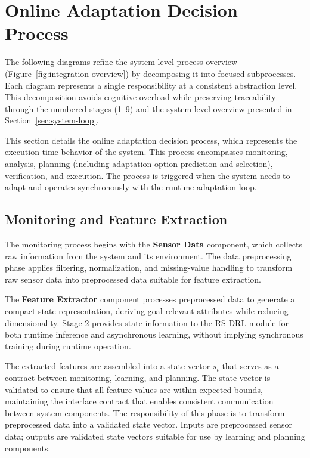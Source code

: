 \documentclass[11pt,a4paper]{article}
\begin{document}

\section{Online Adaptation Decision Process}
\label{sec:online-decision}

The following diagrams refine the system-level process overview (Figure~\ref{fig:integration-overview}) by decomposing it into focused subprocesses. Each diagram represents a single responsibility at a consistent abstraction level. This decomposition avoids cognitive overload while preserving traceability through the numbered stages (1--9) and the system-level overview presented in Section~\ref{sec:system-loop}.

This section details the online adaptation decision process, which represents the execution-time behavior of the system. This process encompasses monitoring, analysis, planning (including adaptation option prediction and selection), verification, and execution. The process is triggered when the system needs to adapt and operates synchronously with the runtime adaptation loop.

\subsection{Monitoring and Feature Extraction}
\label{subsec:monitoring-feature}

The monitoring process begins with the \textbf{Sensor Data} component, which collects raw information from the system and its environment. The data preprocessing phase applies filtering, normalization, and missing-value handling to transform raw sensor data into preprocessed data suitable for feature extraction.

The \textbf{Feature Extractor} component processes preprocessed data to generate a compact state representation, deriving goal-relevant attributes while reducing dimensionality. Stage 2 provides state information to the RS-DRL module for both runtime inference and asynchronous learning, without implying synchronous training during runtime operation.

The extracted features are assembled into a state vector $s_t$ that serves as a contract between monitoring, learning, and planning. The state vector is validated to ensure that all feature values are within expected bounds, maintaining the interface contract that enables consistent communication between system components. The responsibility of this phase is to transform preprocessed data into a validated state vector. Inputs are preprocessed sensor data; outputs are validated state vectors suitable for use by learning and planning components.
\end{document}
